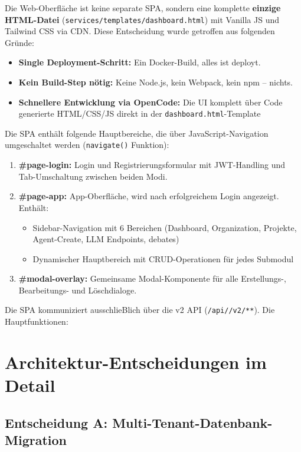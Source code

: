 \documentclass[12pt,a4paper,titlepage,abstract]{scrreprt}
\begin{document}
\begin{compactitem}
{Die Web-Oberfläche ist keine separate SPA, sondern eine komplette \textbf{einzige HTML-Datei} (\texttt{services/templates/dashboard.html}) mit Vanilla JS und Tailwind CSS via CDN. Diese Entscheidung wurde getroffen aus folgenden Gründe:

\begin{itemize}
  \item \textbf{Single Deployment-Schritt:} Ein Docker-Build, alles ist deployt.
  \item \textbf{Kein Build-Step nötig:} Keine Node.js, kein Webpack, kein npm -- nichts. 
  \item \textbf{Schnellere Entwicklung via OpenCode:} Die UI komplett über Code generierte HTML/CSS/JS direkt in der \texttt{dashboard.html}-Template
\end{itemize}

Die SPA enthält folgende Hauptbereiche, die über JavaScript-Navigation umgeschaltet werden (\texttt{navigate()} Funktion):
\begin{enumerate}
    \item \textbf{\#page-login:} Login und Registrierungsformular mit JWT-Handling und Tab-Umschaltung zwischen beiden Modi.  
    \item \textbf{\#page-app:} App-Oberfläche, wird nach erfolgreichem Login angezeigt. Enthält:
      \begin{itemize}
        \item Sidebar-Navigation mit 6 Bereichen (\Sachregister Dashboard, Organization, Projekte, Agent-Create, LLM Endpoints, debates)
        \item Dynamischer Hauptbereich mit CRUD-Operationen für jedes Submodul
      \end{itemize}
    \item \textbf{\#modal-overlay:} Gemeinsame Modal-Komponente für alle Erstellungs-, Bearbeitungs- und Löschdialoge.
\end{enumerate}


Die SPA kommuniziert ausschlieBlich über die v2 API (\texttt{/api/\*/v2/**}). Die Hauptfunktionen:



\chapter{Architektur-Entscheidungen im Detail}

\section*{Entscheidung A: Multi-Tenant-Datenbank-Migration}

}
\end{compactitem}
\end{document}
